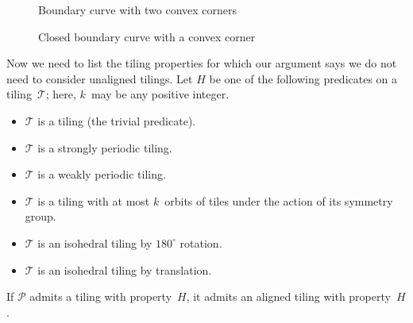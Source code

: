 \begin{figure}[htp!]
\begin{center}
\end{center}
\caption{Boundary curve with two convex corners}
\label{fig:twoconvex}
\end{figure}

\begin{figure}[htp!]
\begin{center}
\end{center}
\caption{Closed boundary curve with a convex corner}
\label{fig:closedconvex}
\end{figure}

Now we need to list the tiling properties for which our argument says
we do not need to consider unaligned tilings.  Let $H$ be one of the
following predicates on a tiling~$\mathcal{T}$; here, $k$~may be any
positive integer.

\begin{itemize}
\item $\mathcal{T}$ is a tiling (the trivial predicate).
\item $\mathcal{T}$ is a strongly periodic tiling.
\item $\mathcal{T}$ is a weakly periodic tiling.
\item $\mathcal{T}$ is a tiling with at most $k$~orbits of tiles
  under the action of its symmetry group.
\item $\mathcal{T}$ is an isohedral tiling by $180^\circ$ rotation.
\item $\mathcal{T}$ is an isohedral tiling by translation.
\end{itemize}

\begin{lemma}
\label{lemma:align}
If $\mathcal{P}$ admits a tiling with property~$H$, it admits an
aligned tiling with property~$H$.
\end{lemma}

